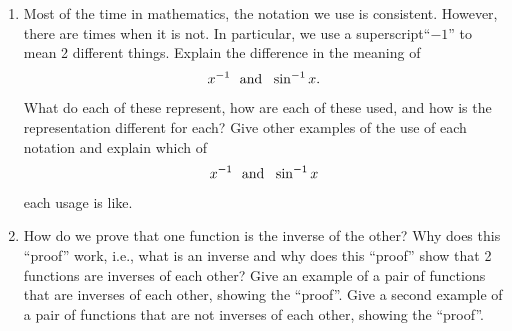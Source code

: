 \begin{enumerate}
\item Most of the time in mathematics, the notation we use is consistent.  However, there are times when it is not.  In particular, we use a superscript``$-1$'' to mean 2 different things.  Explain the difference in the meaning of $$x^{ - 1} \ \  {\rm{and}}\ \  \sin ^{ - 1} x.$$  What do each of these represent, how are each of these used, and how is the representation different for each?  Give other examples of the use of each notation and explain which of $$x^{ - 1} \ \  {\rm{and}}\ \  \sin ^{ - 1} x$$ each usage is like.

\item How do we prove that one function is the inverse of the other?  Why does this ``proof'' work, i.e., what is an inverse and why does this ``proof'' show that 2 functions are inverses of each other?  Give an example of a pair of functions that are inverses of each other, showing the ``proof''.  Give a second example of a pair of functions that are not inverses of each other, showing the ``proof''.

\end{enumerate}
